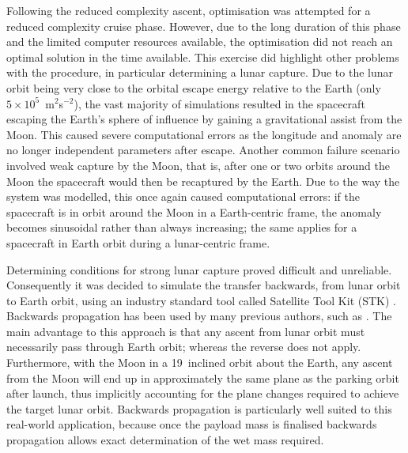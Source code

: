 
Following the reduced complexity ascent, optimisation was attempted for a reduced complexity cruise phase. However, due to the long duration of this phase and the limited computer resources available, the optimisation did not reach an optimal solution in the time available. This exercise did highlight other problems with the procedure, in particular determining a lunar capture. Due to the lunar orbit being very close to the orbital escape energy relative to the Earth (only $5\times10^5$~m$^2$s$^{-2}$), the vast majority of simulations resulted in the spacecraft escaping the Earth's sphere of influence by gaining a gravitational assist from the Moon. This caused severe computational errors as the longitude and anomaly are no longer independent parameters after escape. Another common failure scenario involved weak capture by the Moon, that is, after one or two orbits around the Moon the spacecraft would then be recaptured by the Earth. Due to the way the system was modelled, this once again caused computational errors: if the spacecraft is in orbit around the Moon in a Earth-centric frame, the anomaly becomes sinusoidal rather than always increasing; the same applies for a spacecraft in Earth orbit during a lunar-centric frame.

Determining conditions for strong lunar capture proved difficult and unreliable. Consequently it was decided to simulate the transfer backwards, from lunar orbit to Earth orbit, using an industry standard tool called Satellite Tool Kit (STK) \parencite{STK}. Backwards propagation has been used by many previous authors, such as \textcite{Author}. The main advantage to this approach is that any ascent from lunar orbit must necessarily pass through Earth orbit; whereas the reverse does not apply. Furthermore, with the Moon in a 19\degrees\ inclined orbit about the Earth, any ascent from the Moon will end up in approximately the same plane as the parking orbit after launch, thus implicitly accounting for the plane changes required to achieve the target lunar orbit. Backwards propagation is particularly well suited to this real-world application, because once the payload mass is finalised backwards propagation allows exact determination of the wet mass required.

\clearpage


